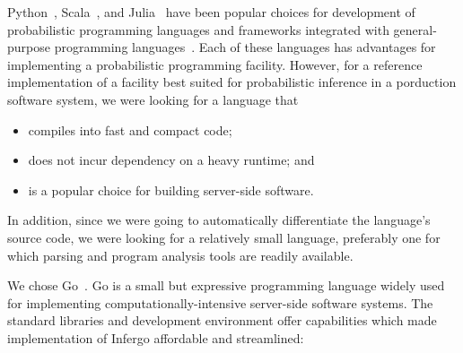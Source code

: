 \documentclass[sigplan,review,10pt,anonymous]{acmart}
\begin{document}
\begin{sloppypar}
Python~\cite{Python95}, Scala~\cite{Scala06}, and
Julia~\cite{Julia14} have been popular choices for development
of probabilistic programming languages and frameworks integrated
with general-purpose programming
languages~\cite{S16,MMW18,BCJ+19,P09,Rainier,GXG18,ISF+18}.
Each of these languages has advantages for implementing a
probabilistic programming facility. However, for a reference
implementation of a facility best suited for probabilistic
inference in a porduction software system, we were looking
for a language that \begin{itemize}
  \item compiles into fast and compact code;
  \item does not incur dependency on a heavy runtime; and
  \item is a popular choice for building server-side software.
\end{itemize}
In addition, since we were going to automatically differentiate
the language's source code, we were looking for a relatively
small language, preferably one for which parsing and program
analysis tools are readily available. 

We chose Go~\cite{Golang}. Go is a small but expressive
programming language widely used for implementing
computationally-intensive server-side software systems. 
The standard libraries and development environment offer
capabilities which made implementation of Infergo affordable
and streamlined:


\end{sloppypar}
\end{document}
